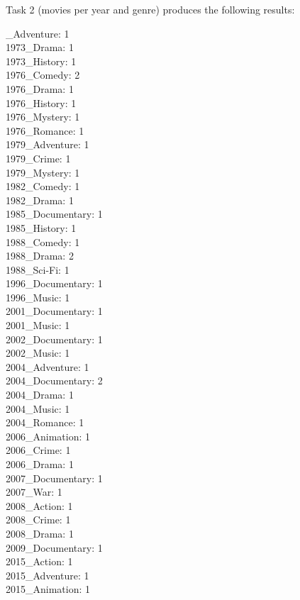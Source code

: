 Task 2 (movies per year and genre) produces the following results:

\begin{multicols}{4}
  \_Adventure:	1
  \\ 1973\_Drama:	1
  \\ 1973\_History:	1
  \\ 1976\_Comedy:	2
  \\ 1976\_Drama:	1
  \\ 1976\_History:	1
  \\ 1976\_Mystery:	1
  \\ 1976\_Romance:	1
  \\ 1979\_Adventure:	1
  \\ 1979\_Crime:	1
  \\ 1979\_Mystery:	1
  \\ 1982\_Comedy:	1
  \\ 1982\_Drama:	1
  \\ 1985\_Documentary:	1
  \\ 1985\_History:	1
  \\ 1988\_Comedy:	1
  \\ 1988\_Drama:	2
  \\ 1988\_Sci-Fi:	1
  \\ 1996\_Documentary:	1
  \\ 1996\_Music:	1
  \\ 2001\_Documentary:	1
  \\ 2001\_Music:	1
  \\ 2002\_Documentary:	1
  \\ 2002\_Music:	1
  \\ 2004\_Adventure:	1
  \\ 2004\_Documentary:	2
  \\ 2004\_Drama:	1
  \\ 2004\_Music:	1
  \\ 2004\_Romance:	1
  \\ 2006\_Animation:	1
  \\ 2006\_Crime:	1
  \\ 2006\_Drama:	1
  \\ 2007\_Documentary:	1
  \\ 2007\_War:	1
  \\ 2008\_Action:	1
  \\ 2008\_Crime:	1
  \\ 2008\_Drama:	1
  \\ 2009\_Documentary:	1
  \\ 2015\_Action:	1
  \\ 2015\_Adventure:	1
  \\ 2015\_Animation:	1
  \label{multicol:test}
\end{multicols}